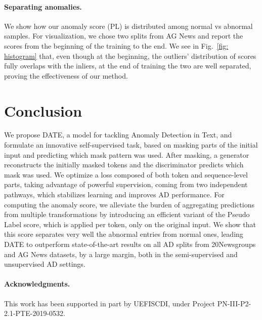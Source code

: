 \documentclass[11pt]{article}
\begin{document}
\paragraph{Separating anomalies.} We show how our anomaly score (PL) is distributed among normal vs abnormal samples. For visualization, we chose two splits from AG News and report the scores from the beginning of the training to the end. We see in Fig.~\ref{fig: histogram} that, even though at the beginning, the outliers' distribution of scores fully overlaps with the inliers, at the end of training the two are well separated, proving the effectiveness of our method.


\section{Conclusion}
We propose DATE, a model for tackling Anomaly Detection in Text, and formulate an innovative self-supervised task, based on masking parts of the initial input and predicting which mask pattern was used. After masking, a generator reconstructs the initially masked tokens and the discriminator predicts which mask was used.
We optimize a loss composed of both token and sequence-level parts, taking advantage of powerful supervision, coming from two independent pathways, which stabilizes learning and improves AD performance.
For computing the anomaly score, we alleviate the burden of aggregating predictions from multiple transformations by introducing an efficient variant of the Pseudo Label score, which is applied per token, only on the original input.
We show that this score separates very well the abnormal entries from normal ones, leading DATE to outperform state-of-the-art results on all AD splits from 20Newsgroups and AG News datasets, by a large margin, both in the semi-supervised and unsupervised AD settings.

\paragraph{Acknowledgments.} This work has been supported in part by UEFISCDI, under Project PN-III-P2-2.1-PTE-2019-0532.

\clearpage






\appendix
\end{document}
